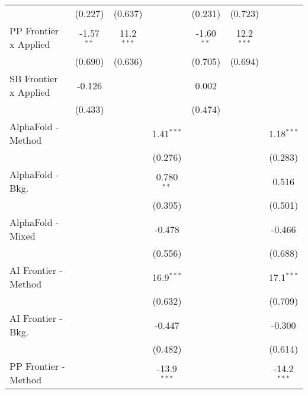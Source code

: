 \begin{tabular}{lcccccc}
                                  & (0.227)        & (0.637)       &               & (0.231)       & (0.723)       &   \\   
   PP Frontier x Applied          & -1.57$^{**}$   & 11.2$^{***}$  &               & -1.60$^{**}$  & 12.2$^{***}$  &   \\   
                                  & (0.690)        & (0.636)       &               & (0.705)       & (0.694)       &   \\   
   SB Frontier x Applied          & -0.126         &               &               & 0.002         &               &   \\   
                                  & (0.433)        &               &               & (0.474)       &               &   \\   
   AlphaFold - Method             &                &               & 1.41$^{***}$  &               &               & 1.18$^{***}$\\   
                                  &                &               & (0.276)       &               &               & (0.283)\\   
   AlphaFold - Bkg.               &                &               & 0.780$^{**}$  &               &               & 0.516\\   
                                  &                &               & (0.395)       &               &               & (0.501)\\   
   AlphaFold - Mixed              &                &               & -0.478        &               &               & -0.466\\   
                                  &                &               & (0.556)       &               &               & (0.688)\\   
   AI Frontier - Method           &                &               & 16.9$^{***}$  &               &               & 17.1$^{***}$\\   
                                  &                &               & (0.632)       &               &               & (0.709)\\   
   AI Frontier - Bkg.             &                &               & -0.447        &               &               & -0.300\\   
                                  &                &               & (0.482)       &               &               & (0.614)\\   
   PP Frontier - Method           &                &               & -13.9$^{***}$ &               &               & -14.2$^{***}$\\   

\end{tabular}
